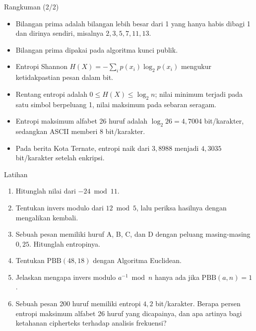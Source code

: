 \documentclass[aspectratio=169,11pt]{beamer}
\begin{document}
\begin{frame}{Rangkuman (2/2)}
    \footnotesize
    \begin{itemize}
        \item Bilangan prima adalah bilangan lebih besar dari 1 yang hanya
              habis dibagi 1 dan dirinya sendiri, misalnya
              $2, 3, 5, 7, 11, 13$.
        \item Bilangan prima dipakai pada algoritma kunci publik.
        \item Entropi Shannon
              $H(X) = -\sum_i p(x_i)\log_2 p(x_i)$ mengukur ketidakpastian
              pesan dalam bit.
        \item Rentang entropi adalah $0 \le H(X) \le \log_2 n$; nilai minimum
              terjadi pada satu simbol berpeluang 1, nilai maksimum pada
              sebaran seragam.
        \item Entropi maksimum alfabet 26 huruf adalah
              $\log_2 26 = 4{,}7004$ bit/karakter, sedangkan ASCII memberi
              $8$ bit/karakter.
        \item Pada berita Kota Ternate, entropi naik dari $3{,}8988$ menjadi
              $4{,}3035$ bit/karakter setelah enkripsi.
    \end{itemize}
\end{frame}

\begin{frame}{Latihan}
    \footnotesize
    \begin{enumerate}
        \item Hitunglah nilai dari $-24 \bmod 11$.
        \item Tentukan invers modulo dari $12 \bmod 5$, lalu periksa hasilnya
              dengan mengalikan kembali.
        \item Sebuah pesan memiliki huruf A, B, C, dan D dengan peluang
              masing-masing $0{,}25$. Hitunglah entropinya.
        \item Tentukan $\text{PBB}(48,18)$ dengan Algoritma Euclidean.
        \item Jelaskan mengapa invers modulo $a^{-1} \bmod n$ hanya ada jika
              $\text{PBB}(a,n) = 1$.
        \item Sebuah pesan 200 huruf memiliki entropi $4{,}2$ bit/karakter.
              Berapa persen entropi maksimum alfabet 26 huruf yang dicapainya,
              dan apa artinya bagi ketahanan cipherteks terhadap analisis
              frekuensi?
    \end{enumerate}
\end{frame}
\end{document}
